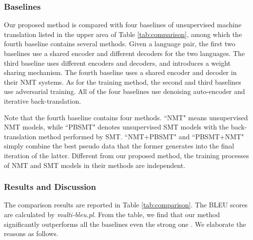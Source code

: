 \documentclass[letterpaper]{article} \usepackage{aaai19}  \usepackage{times}  \usepackage{helvet}  \usepackage{courier}  \usepackage{url}  \usepackage{graphicx}  \usepackage{amsmath}
\begin{document}
\subsubsection{Baselines}
Our proposed method is compared with four baselines of unsupervised machine translation listed in the upper area of Table \ref{tab:comparison}, among which the fourth baseline contains several methods. Given a language pair, the first two baselines \cite{artetxe2017unsupervised,lample2017unsupervised} use a shared encoder and different decoders for the two languages. The third baseline \cite{yang2018unsupervised} uses different encoders and decoders, and introduces a weight sharing mechanism. The fourth baseline \cite{lample2018phrase} uses a shared encoder and decoder in their NMT systems. As for the training method, the second and third baselines use adversarial training. All of the four baselines use denoising auto-encoder and iterative back-translation.

Note that the fourth baseline contains four methods. ``NMT" means unsupervised NMT models, while ``PBSMT" denotes unsupervised SMT models with the back-translation method performed by SMT. ``NMT+PBSMT" and ``PBSMT+NMT" simply combine the best pseudo data that the former generates into the final iteration of the latter. Different from our proposed method, the training processes of NMT and SMT models in their methods are independent. 
 
\subsubsection{Results and Discussion}
The comparison results are reported in Table \ref{tab:comparison}. The BLEU scores are calculated by \emph{multi-bleu.pl}. From the table, we find that our method significantly outperforms all the baselines even the strong one \cite{lample2018phrase}. We elaborate the reasons as follows.
\end{document}
